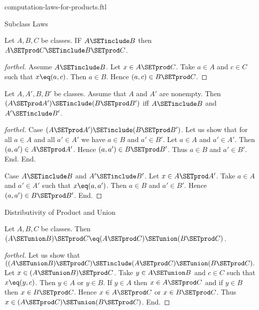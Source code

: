 \documentclass{naproche-library}
\begin{document}
\begin{smodule}[title=Computation Laws for Cartesian Products]{computation-laws-for-products.ftl}

\begin{sfragment}{Subclass Laws}
  \begin{proposition}[forthel,id=FOUNDATIONS_05_5719644021194752]
    Let $A, B, C$ be classes.
    IF $A \SETinclude B$ then $A \SETprod C \SETinclude B \SETprod C$.
  \end{proposition}
  \begin{proof}[forthel]
    Assume $A \SETinclude B$.
    Let $x \in A \SETprod C$.
    Take $a \in A$ and $c \in C$ such that $x \eq (a, c)$.
    Then $a \in B$.
    Hence $(a, c) \in B \SETprod C$.
  \end{proof}

  \begin{proposition}[forthel,id=FOUNDATIONS_05_4888282951319552]
    Let $A, A', B, B'$ be classes.
    Assume that $A$ and $A'$ are nonempty.
    Then $(A \SETprod A') \SETinclude (B \SETprod B')$ iff $A \SETinclude B$ and $A' \SETinclude B'$.
  \end{proposition}
  \begin{proof}[forthel]
    Case $(A \SETprod A') \SETinclude (B \SETprod B')$.
      Let us show that for all $a \in A$ and all $a' \in A'$ we have $a \in B$ and $a' \in B'$.
        Let $a \in A$ and $a' \in A'$.
        Then $(a, a') \in A \SETprod A'$.
        Hence $(a, a') \in B \SETprod B'$.
        Thus $a \in B$ and $a' \in B'$.
      End.
    End.

    Case $A \SETinclude B$ and $A' \SETinclude B'$.
      Let $x \in A \SETprod A'$.
      Take $a \in A$ and $a' \in A'$ such that $x \eq (a, a')$.
      Then $a \in B$ and $a' \in B'$.
      Hence $(a, a') \in B \SETprod B'$.
    End.
  \end{proof}
\end{sfragment}

\begin{sfragment}{Distributivity of Product and Union}
  \begin{proposition}[forthel,id=FOUNDATIONS_05_8849658323402752]
    Let $A, B, C$ be classes.
    Then $(A \SETunion B) \SETprod C \eq (A \SETprod C) \SETunion (B \SETprod C)$.
  \end{proposition}
  \begin{proof}[forthel]
    Let us show that $((A \SETunion B) \SETprod C) \SETinclude (A \SETprod C) \SETunion (B \SETprod C).$ %
      Let $x \in (A \SETunion B) \SETprod C$.
      Take $y \in A \SETunion B$ and $c \in C$ such that $x \eq (y, c)$.
      Then $y \in A$ or $y \in B$.
      If $y \in A$ then $x \in A \SETprod C$ and if $y \in B$ then $x \in B \SETprod C$.
      Hence $x \in A \SETprod C$ or $x \in B \SETprod C$.
      Thus $x \in (A \SETprod C) \SETunion (B \SETprod C)$.
    End.


\end{proof}
\end{sfragment}
\end{smodule}
\end{document}
